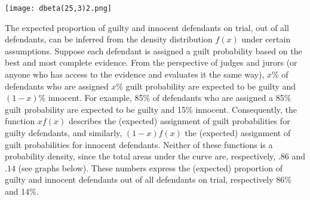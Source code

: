 \documentclass{article}
\begin{document}
\begin{center}
    \texttt{[image: dbeta(25,3)2.png]}
\end{center}


 
The expected proportion of guilty and innocent defendants on trial, out of all defendants, can be inferred from the density distribution $f(x)$ under certain assumptions. Suppose each defendant is assigned a guilt probability based on the best and most complete evidence. 
From the perspective of judges and jurors (or anyone who has access to the evidence and evaluates it the same way), 
$x\%$ of defendants who are assigned  $x\%$ guilt probability are expected to be guilty and $(1-x)\%$ innocent. For example, 85\% of defendants  who are assigned a 85\% guilt probability are expected to be guilty and 15\% innocent.
Consequently, the function $xf(x)$ describes the (expected) assignment  of guilt probabilities for guilty defendants, and similarly, $(1-x)f(x)$   the (expected) assignment of guilt probabilities for innocent defendants. Neither of these functions is a probability density, since %
the total areas under the curve are, respectively, $.86$ and $.14$ (see graphs below).
 These numbers express the (expected) proportion of guilty and innocent defendants out of all defendants on trial, respectively 86\% and 14\%. 
 
\end{document}
